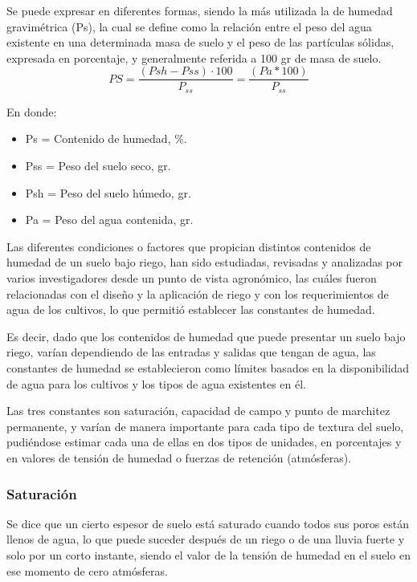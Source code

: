 Se puede expresar en diferentes formas, siendo la más utilizada la de humedad gravimétrica (Ps), la cual se define como la relación entre el peso del agua existente en una determinada masa de suelo y el peso de las partículas sólidas, expresada en porcentaje, y generalmente referida a 100 gr de masa de suelo.
\begin{equation}
PS = \frac{(Psh - Pss) \cdot 100}{P_{ss}} = \frac{(Pa * 100)}{P_{ss}}
\end{equation}
\begin{notation}
En donde:
\begin{itemize}
\item Ps = Contenido de humedad, \%.
\item Pss = Peso del suelo seco, gr.
\item Psh = Peso del suelo húmedo, gr.
\item Pa = Peso del agua contenida, gr.
\end{itemize}
\end{notation}
Las diferentes condiciones o factores que propician distintos contenidos de humedad de un suelo bajo riego, han sido estudiadas, revisadas y analizadas por varios investigadores desde un punto de vista agronómico, las cuáles fueron relacionadas con el diseño y la aplicación de riego y con los requerimientos de agua de los cultivos, lo que permitió establecer las constantes de humedad.

Es decir, dado que los contenidos de humedad que puede presentar un suelo bajo riego, varían dependiendo de las entradas y salidas que tengan de agua, las constantes de humedad se establecieron como límites basados en la disponibilidad de agua para los cultivos y los tipos de agua existentes en él.

Las tres constantes son saturación, capacidad de campo y punto de marchitez permanente, y varían de manera importante para cada tipo de textura del suelo, pudiéndose estimar cada una de ellas en dos tipos de unidades, en porcentajes y en valores de tensión de humedad o fuerzas de retención (atmósferas).

\subsubsection{Saturación}
Se dice que un cierto espesor de suelo está saturado cuando todos sus poros están llenos de agua, lo que puede suceder después de un riego o de una lluvia fuerte y solo por un corto instante, siendo el valor de la tensión de humedad en el suelo en ese momento de cero atmósferas.

